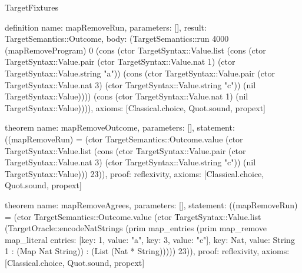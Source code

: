 \begin{lexlean}{TargetFixtures}
\begin{semanticmodule}
definition{
  name: mapRemoveRun,
  parameters: [],
  result: TargetSemantics::Outcome,
  body: (TargetSemantics::run 4000 (mapRemoveProgram) 0 (cons (ctor TargetSyntax::Value.list (cons (ctor TargetSyntax::Value.pair (ctor TargetSyntax::Value.nat 1) (ctor TargetSyntax::Value.string "a")) (cons (ctor TargetSyntax::Value.pair (ctor TargetSyntax::Value.nat 3) (ctor TargetSyntax::Value.string "c")) (nil TargetSyntax::Value)))) (cons (ctor TargetSyntax::Value.nat 1) (nil TargetSyntax::Value)))),
  axioms: [Classical.choice, Quot.sound, propext]
}

theorem{
  name: mapRemoveOutcome,
  parameters: [],
  statement: ((mapRemoveRun) = (ctor TargetSemantics::Outcome.value (ctor TargetSyntax::Value.list (cons (ctor TargetSyntax::Value.pair (ctor TargetSyntax::Value.nat 3) (ctor TargetSyntax::Value.string "c")) (nil TargetSyntax::Value))) 23)),
  proof: reflexivity{},
  axioms: [Classical.choice, Quot.sound, propext]
}

theorem{
  name: mapRemoveAgrees,
  parameters: [],
  statement: ((mapRemoveRun) = (ctor TargetSemantics::Outcome.value (ctor TargetSyntax::Value.list (TargetOracle::encodeNatStrings (prim map_entries (prim map_remove map_literal{
    entries: [{key: 1, value: "a"}, {key: 3, value: "c"}],
    key: Nat,
    value: String
  } 1 : (Map Nat String)) : (List (Nat * String))))) 23)),
  proof: reflexivity{},
  axioms: [Classical.choice, Quot.sound, propext]
}


\end{semanticmodule}
\end{lexlean}
